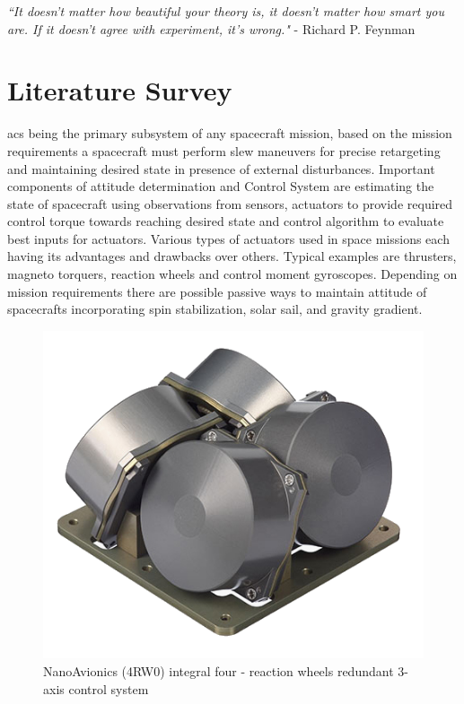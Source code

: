\vspace*{20px}
\begin{center}
\textit{``It doesn't matter how beautiful your theory is, it doesn't matter how smart you are. If it doesn't agree with experiment, it's wrong."} 
\flushright - Richard P. Feynman

\end{center}

\section{Literature Survey}
\acrfull{acs} being the primary subsystem of any spacecraft mission, based on the mission requirements a spacecraft must perform slew maneuvers for precise retargeting and maintaining desired state in presence of external disturbances. Important components of attitude determination and Control System are estimating the state of spacecraft using observations from sensors, actuators to provide required control torque towards reaching desired state and control algorithm to evaluate best inputs for actuators. Various types of actuators used in space missions each having its advantages and drawbacks over others. Typical examples are thrusters, magneto torquers, reaction wheels and control moment gyroscopes. Depending on mission requirements there are possible passive ways to maintain attitude of spacecrafts incorporating spin stabilization, solar sail, and gravity gradient. 
\begin{figure}[h!]
    \centering
    \includegraphics[width=0.5\linewidth]{figures/SatBus-4RW0-1-new.png}
    \caption{NanoAvionics (4RW0) integral four - reaction wheels redundant 3-axis control system  }
    \label{fig:na4RW0}
\end{figure}

